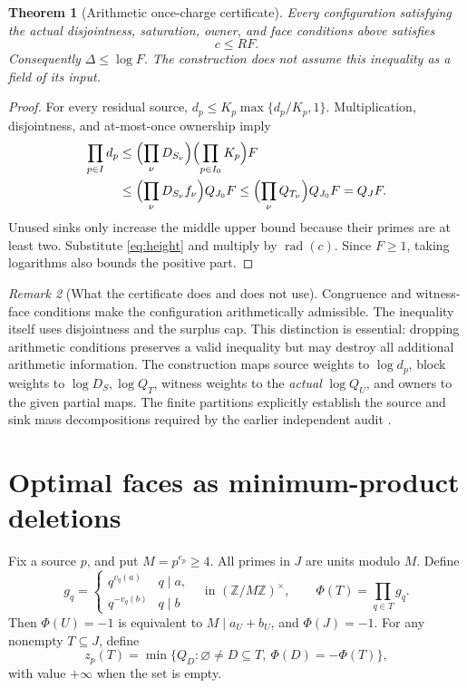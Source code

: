 \documentclass[11pt]{article}
\newtheorem{theorem}{Theorem}[section]
\theoremstyle{definition}\newtheorem{definition}[theorem]{Definition}
\theoremstyle{remark}\newtheorem{remark}[theorem]{Remark}
\newcommand{\rad}{\operatorname{rad}}
\newcommand{\Z}{\mathbb Z}
\begin{document}
\begin{theorem}[Arithmetic once-charge certificate]\label{thm:certificate}
Every configuration satisfying the actual disjointness, saturation, owner,
and face conditions above satisfies
\begin{equation}\label{eq:rationalbridge} c\le R F.\end{equation}
Consequently \(\Delta\le\log F\). The construction does not assume this
inequality as a field of its input.
\end{theorem}
\begin{proof}
For every residual source,
\(d_p\le K_p\max\{d_p/K_p,1\}\).
Multiplication, disjointness, and at-most-once ownership imply
\begin{align*}
 \prod_{p\in I}d_p
 &\le \Bigl(\prod_\nu D_{S_\nu}\Bigr)
       \Bigl(\prod_{p\in I_0}K_p\Bigr)F\\
 &\le \Bigl(\prod_\nu D_{S_\nu}f_\nu\Bigr) Q_{J_0} F
 \le \Bigl(\prod_\nu Q_{T_\nu}\Bigr)Q_{J_0}F=Q_JF.
\end{align*}
Unused sinks only increase the middle upper bound because their primes are
at least two. Substitute \eqref{eq:height} and multiply by \(\rad(c)\).
Since \(F\ge1\), taking logarithms also bounds the positive part.
\end{proof}

\begin{remark}[What the certificate does and does not use]
Congruence and witness-face conditions make the configuration arithmetically
admissible. The inequality itself uses disjointness and the surplus cap.
This distinction is essential: dropping arithmetic conditions preserves a
valid inequality but may destroy all additional arithmetic information.
The construction maps source weights to \(\log d_p\), block weights to
\(\log D_S,\log Q_T\), witness weights to the \emph{actual} \(\log Q_U\),
and owners to the given partial maps. The finite partitions explicitly
establish the source and sink mass decompositions required by the earlier
independent audit \cite{repoaudit}.
\end{remark}

\section{Optimal faces as minimum-product deletions}
Fix a source \(p\), and put \(M=p^{e_p}\ge4\).
All primes in \(J\) are units modulo \(M\). Define
\[
 g_q=\begin{cases}q^{v_q(a)}&q\mid a,\\q^{-v_q(b)}&q\mid b\end{cases}
 \quad\text{in }(\Z/M\Z)^\times,
 \qquad \Phi(T)=\prod_{q\in T}g_q.
\]
Then \(\Phi(U)=-1\) is equivalent to \(M\mid a_U+b_U\), and
\(\Phi(J)=-1\).
For any nonempty \(T\subseteq J\), define
\begin{equation}\label{eq:z}
 z_p(T)=\min\{Q_D:\varnothing\ne D\subseteq T,
                         \ \Phi(D)=-\Phi(T)\},
\end{equation}
with value \(+\infty\) when the set is empty.
\end{document}
